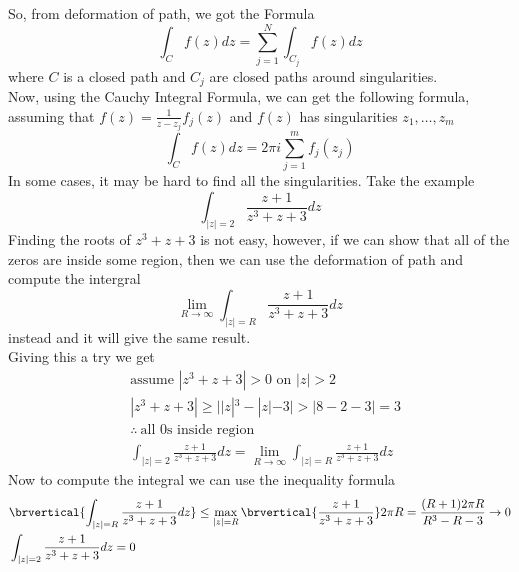 So, from deformation of path, we got the Formula
\[\int_Cf(z)dz=\sum_{j=1}^N\int_{C_j}f(z)dz\]
where $C$ is a closed path and $C_j$ are closed paths around singularities.\\
Now, using the Cauchy Integral Formula, we can get the following formula, assuming that $f(z)=\frac{1}{z-z_j}f_j(z)$ and $f(z)$ has singularities $z_1,\ldots,z_m$
\[\int_C f(z)dz=2\pi i\sum_{j=1}^m f_j(z_j)\]
In some cases, it may be hard to find all the singularities. Take the example
\[\int_{|z|=2}\frac{z+1}{z^3+z+3}dz\]
Finding the roots of $z^3+z+3$ is not easy, however, if we can show that all of the zeros are inside some region, then we can use the deformation of path and compute the intergral
\[\lim_{R\to\infty}\int_{|z|=R}\frac{z+1}{z^3+z+3}dz\]
instead and it will give the same result.\\
Giving this a try we get
\begin{align*}
    &\text{assume }|z^3+z+3|>0\text{ on }|z|> 2\\
    &|z^3+z+3|\geq ||z|^3-|z|-3|>|8-2-3|=3\\
    &\therefore\ \text{all 0s inside region}\\
    &\int_{|z|=2}\frac{z+1}{z^3+z+3}dz=\lim_{R\to\infty}\int_{|z|=R}\frac{z+1}{z^3+z+3}dz
\end{align*}
Now to compute the integral we can use the inequality formula
\begin{align*}
    &\brvertical{\int_{|z|=R}\frac{z+1}{z^3+z+3}dz}\leq\max_{|z|=R}\brvertical{\frac{z+1}{z^3+z+3}}2\pi R=\frac{(R+1)2\pi R}{R^3-R-3}\to0\\
    &\int_{|z|=2}\frac{z+1}{z^3+z+3}dz=0
\end{align*}